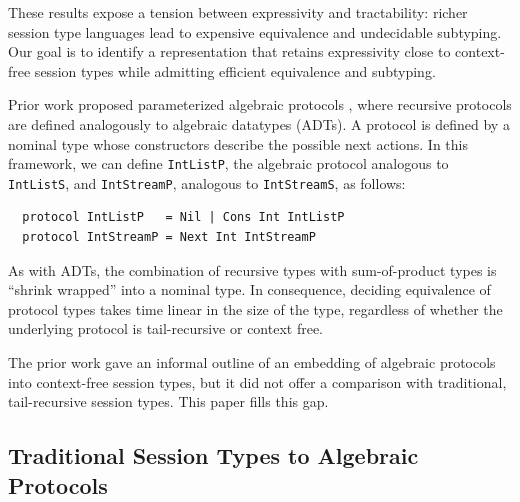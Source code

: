 These results expose a tension between expressivity and
tractability: richer session type languages lead to expensive
equivalence and undecidable subtyping. Our goal is to identify a
representation that retains expressivity close to context-free session
types while admitting efficient equivalence and subtyping.

Prior work proposed parameterized algebraic
protocols \cite{DBLP:journals/pacmpl/MordidoS0V23}, where recursive
protocols are defined analogously to algebraic datatypes (ADTs).
A protocol is defined by a nominal type whose
constructors describe the possible next actions. 
In this framework, we
can define \lstinline{IntListP}, the algebraic protocol analogous
to \lstinline{IntListS}, and \lstinline{IntStreamP}, analogous to
\lstinline{IntStreamS}, as follows:
\begin{lstlisting}
  protocol IntListP   = Nil | Cons Int IntListP
  protocol IntStreamP = Next Int IntStreamP
\end{lstlisting}
As with ADTs, the combination of recursive types with sum-of-product
types is ``shrink wrapped'' into a nominal type. In consequence,
deciding equivalence of protocol types takes time linear in the size
of the type, regardless of whether the underlying protocol is
tail-recursive or context free.

The prior work gave an informal outline of an embedding of
algebraic protocols into context-free session types, but it did not offer
a comparison with traditional, tail-recursive session types. This paper fills this gap.

\subsection{Traditional Session Types to Algebraic Protocols}
\label{sec:trad-sess-types}

